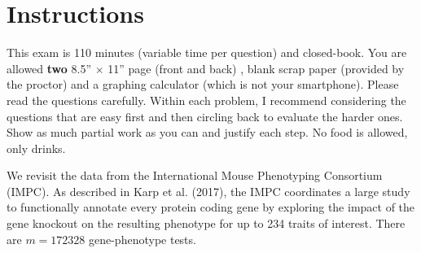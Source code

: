 \documentclass[12pt]{article}
\begin{document}
\section*{Instructions}
This exam is 110 minutes (variable time per question) and closed-book. You are allowed \textbf{two} 8.5'' $\times$ 11'' page (front and back) , blank scrap paper (provided by the proctor) and a graphing calculator (which is not your smartphone). Please read the questions carefully. Within each problem, I recommend considering the questions that are easy first and then circling back to evaluate the harder ones. Show as much partial work as you can and justify each step. No food is allowed, only drinks. %

\pagebreak

\problem We revisit the data from the International Mouse Phenotyping Consortium (IMPC). As described in Karp et al. (2017), the IMPC coordinates a large study to functionally annotate every protein coding gene by exploring the impact of the gene knockout on the resulting phenotype for up to 234 traits of interest. There are $m = 172328$ gene-phenotype tests.
\end{document}
